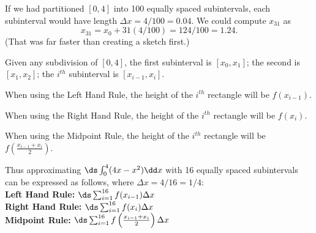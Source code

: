If we had partitioned $[0,4]$ into 100 equally spaced subintervals, each subinterval would have length $\Delta x=4/100 = 0.04$. We could compute $x_{31}$ as
\[x_{31}=x_0+31(4/100)=124/100=1.24.\]
(That was far faster than creating a sketch first.)

Given any subdivision of $[0,4]$, the first subinterval is $[x_0,x_1]$; the second is $[x_1,x_2]$; the $i^{th}$ subinterval is $[x_{i-1},x_i]$.

\noindent When using the Left Hand Rule, the height of the $i^{th}$ rectangle will be $f(x_{i-1})$.

\noindent When using the Right Hand Rule, the height of the $i^{th}$ rectangle will be $f(x_i)$.

\noindent When using the Midpoint Rule, the height of the $i^{th}$ rectangle will be $f\left(\frac{x_{i-1}+x_i}{2}\right)$.

Thus approximating $\ds\int_0^4(4x-x^2)\dd x$ with 16 equally spaced subintervals can be expressed as follows, where $\Delta x = 4/16 = 1/4$:\smallskip\\
\textbf{Left Hand Rule:} $\ds\sum_{i=1}^{16} f(x_{i-1})\Delta x$\smallskip\\
\textbf{Right Hand Rule:} $\ds\sum_{i=1}^{16} f(x_i)\Delta x$\smallskip\\
\textbf{Midpoint Rule:} $\ds\sum_{i=1}^{16} f\left(\frac{x_{i-1}+x_i}2\right)\Delta x$


